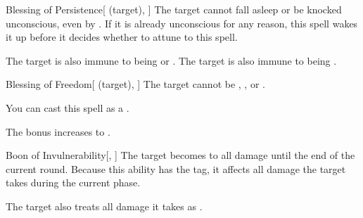 \lowercase{\hypertarget{spell:Blessing of Persistence}{}}\label{spell:Blessing of Persistence}
\begin{attuneability}[Rank 4]{\hypertarget{spell:Blessing of Persistence}{Blessing of Persistence}}[ (target), ]
The target cannot fall asleep or be knocked unconscious, even by .
If it is already unconscious for any reason, this spell wakes it up before it decides whether to attune to this spell.


\rankline
{} The target is also immune to being  or .
 The target is also immune to being .
\end{attuneability}
\vspace{0.25em}



\lowercase{\hypertarget{spell:Blessing of Freedom}{}}\label{spell:Blessing of Freedom}
\begin{attuneability}[Rank 5]{\hypertarget{spell:Blessing of Freedom}{Blessing of Freedom}}[ (target), ]
The target cannot be , , or .

You can cast this spell as a .

\rankline
{} The bonus increases to .
\end{attuneability}
\vspace{0.25em}



\lowercase{\hypertarget{spell:Boon of Invulnerability}{}}\label{spell:Boon of Invulnerability}
\begin{freeability}[Rank 6]{\hypertarget{spell:Boon of Invulnerability}{Boon of Invulnerability}}[, ]
The target becomes  to all damage until the end of the current round.
Because this ability has the  tag, it affects all damage the target takes during the current phase.

\rankline
{} The target also treats all damage it takes as .
\end{freeability}
\vspace{0.25em}



